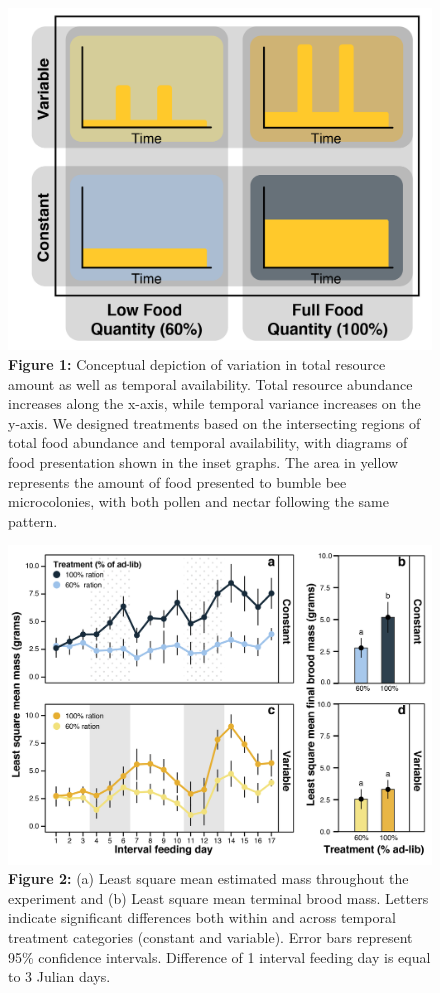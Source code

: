 \documentclass[11pt,]{article}
\begin{document}
\begin{figure}
\centering
\includegraphics{./fig1_conceptual.png}
\caption{\textbf{Figure 1:} Conceptual depiction of variation in total
resource amount as well as temporal availability. Total resource
abundance increases along the x-axis, while temporal variance increases
on the y-axis. We designed treatments based on the intersecting regions
of total food abundance and temporal availability, with diagrams of food
presentation shown in the inset graphs. The area in yellow represents
the amount of food presented to bumble bee microcolonies, with both
pollen and nectar following the same pattern.}
\end{figure}

\clearpage

\newpage

\begin{figure}
\centering
\includegraphics{./fig2_mc_mass.png}
\caption{\textbf{Figure 2:} (a) Least square mean estimated mass
throughout the experiment and (b) Least square mean terminal brood mass.
Letters indicate significant differences both within and across temporal
treatment categories (constant and variable). Error bars represent 95\%
confidence intervals. Difference of 1 interval feeding day is equal to 3
Julian days.}
\end{figure}
\end{document}
